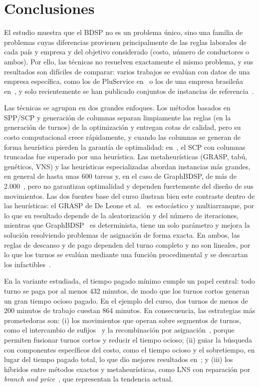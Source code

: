 \documentclass[letter, 10pt]{article}
\begin{document}
\section{Conclusiones}\label{sec:conc}
El estudio muestra que el BDSP no es un problema único, sino una familia de problemas cuyas diferencias provienen principalmente de las reglas laborales de cada país y empresa y del objetivo considerado (costo, número de conductores o ambos). Por ello, las técnicas no resuelven exactamente el mismo problema, y sus resultados son difíciles de comparar: varios trabajos se evalúan con datos de una empresa específica, como los de PluService en~\cite{DeLeone2011a} o los de una empresa brasileña en~\cite{Constantino2017}, y solo recientemente se han publicado conjuntos de instancias de referencia~\cite{Constantino2017,Kletzander2020}.

Las técnicas se agrupan en dos grandes enfoques. Los métodos basados en SPP/SCP y generación de columnas separan limpiamente las reglas (en la generación de turnos) de la optimización y entregan cotas de calidad, pero su costo computacional crece rápidamente, y cuando las columnas se generan de forma heurística pierden la garantía de optimalidad: en~\cite{Constantino2017}, el SCP con columnas truncadas fue superado por una heurística. Las metaheurísticas (GRASP, tabú, genéticos, VNS) y las heurísticas especializadas abordan instancias más grandes, en general de hasta unas 600 tareas y, en el caso de GraphBDSP, de más de 2.000~\cite{Constantino2017}, pero no garantizan optimalidad y dependen fuertemente del diseño de sus movimientos. Las dos fuentes base del curso ilustran bien este contraste dentro de las heurísticas: el GRASP de De Leone et al.~\cite{DeLeone2011a} es estocástico y multiarranque, por lo que su resultado depende de la aleatorización y del número de iteraciones, mientras que GraphBDSP~\cite{Constantino2017} es determinista, tiene un solo parámetro y mejora la solución resolviendo problemas de asignación de forma exacta. En ambos, las reglas de descanso y de pago dependen del turno completo y no son lineales, por lo que los turnos se evalúan mediante una función procedimental y se descartan los infactibles~\cite{DeLeone2011a,Constantino2017}.

En la variante estudiada, el tiempo pagado mínimo cumple un papel central: todo turno se paga por al menos 432 minutos, de modo que los turnos cortos generan un gran tiempo ocioso pagado. En el ejemplo del curso, dos turnos de menos de 200 minutos de trabajo cuestan 864 minutos. En consecuencia, las estrategias más prometedoras son: (i) los movimientos que operan sobre segmentos de turnos, como el intercambio de sufijos~\cite{DeLeone2011a} y la recombinación por asignación~\cite{Constantino2017}, porque permiten fusionar turnos cortos y reducir el tiempo ocioso; (ii) guiar la búsqueda con componentes específicos del costo, como el tiempo ocioso y el sobretiempo, en lugar del tiempo pagado total, lo que dio mejores resultados en~\cite{Constantino2017}; y (iii) los híbridos entre métodos exactos y metaheurísticas, como LNS con reparación por \emph{branch and price}~\cite{Kletzander2026}, que representan la tendencia actual.
\end{document}
